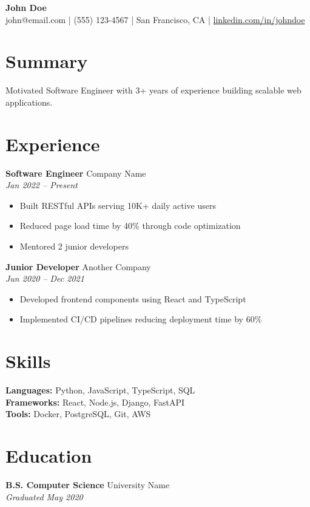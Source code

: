 \documentclass[11pt]{article}
\begin{document}
\begin{center}
{\LARGE \textbf{John Doe}} \\[4pt]
john@email.com | (555) 123-4567 | San Francisco, CA | \href{https://linkedin.com/in/johndoe}{linkedin.com/in/johndoe}
\end{center}

\section{Summary}
Motivated Software Engineer with 3+ years of experience building scalable web applications.

\section{Experience}
\textbf{Software Engineer} \hfill Company Name \\
\textit{Jan 2022 -- Present}
\begin{itemize}[nosep]
\item Built RESTful APIs serving 10K+ daily active users
\item Reduced page load time by 40\% through code optimization
\item Mentored 2 junior developers
\end{itemize}

\textbf{Junior Developer} \hfill Another Company \\
\textit{Jun 2020 -- Dec 2021}
\begin{itemize}[nosep]
\item Developed frontend components using React and TypeScript
\item Implemented CI/CD pipelines reducing deployment time by 60\%
\end{itemize}

\section{Skills}
\textbf{Languages:} Python, JavaScript, TypeScript, SQL \\
\textbf{Frameworks:} React, Node.js, Django, FastAPI \\
\textbf{Tools:} Docker, PostgreSQL, Git, AWS

\section{Education}
\textbf{B.S. Computer Science} \hfill University Name \\
\textit{Graduated May 2020}
\end{document}
